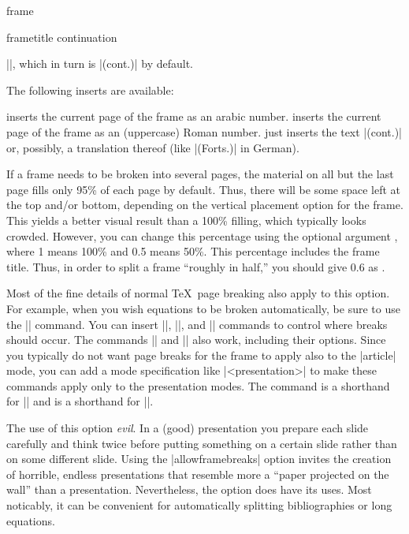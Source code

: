 \begin{environment}{{frame}%
    }
\begin{frame}[<+->][plain]
\begin{frame}[plain]
\begin{itemize}
\begin{enumerate}
\begin{template*}{frametitle continuation}
\begin{templateoptions}
          |\insertcontinuationtext|,  which  in turn is |(cont.)| by
          default. 
        \end{templateoptions}
        The following inserts are available:
        \begin{templateinserts}
          \iteminsert{\insertcontinuationcount}
          inserts the current page of the frame as an arabic number.
          \iteminsert{\insertcontinuationcountroman}
          inserts the current page of the frame as an (uppercase)
          Roman number.
          \iteminsert{\insertcontinuationtext}
          just inserts the text |(cont.)| or, possibly, a translation
          thereof (like |(Forts.)| in German). 
        \end{templateinserts}
      \end{template*}
    \end{enumerate}
    If a frame needs to be broken into several pages, the material on
    all but the last page fills only 95\% of each page by
    default. Thus, there will be some space left at the top and/or
    bottom, depending on the vertical placement option for the
    frame. This yields a better visual result than a 100\% filling,
    which typically looks crowded. However, you can change this
    percentage using the optional argument , where 1
    means 100\% and 0.5 means 50\%. This percentage includes
    the frame title. Thus, in order to split a frame ``roughly in
    half,'' you should give 0.6 as .

    Most of the fine details of normal \TeX\ page breaking also apply
    to this option. For example, when you wish equations to be broken
    automatically, be sure to use the |\allowdisplaybreaks|
    command. You can insert |\break|, |\nobreak|, and |\penalty|
    commands to control where breaks should occur. The commands 
    |\pagebreak| and |\nopagebreak| also work, including their
    options. Since you typically do not want page breaks for the frame
    to apply also to the |article| mode, you can add a mode
    specification like |<presentation>| to make these commands apply
    only to the presentation modes. The command
    \declare{|\string\framebreak|} is a shorthand for
    || and \declare{|\string\noframebreak|} is
    a shorthand for ||.

    The use of this  option \emph{evil}. In a (good) presentation you
    prepare each slide carefully and think twice before putting something
    on a certain slide rather than on some different slide. Using the
    |allowframebreaks| option invites the creation of horrible, endless
    presentations that resemble more a ``paper projected on the wall''
    than a presentation. Nevertheless, the option does have its
    uses. Most noticably, it can be convenient for automatically
    splitting bibliographies or long equations.


\end{itemize}
\end{frame}
\end{frame}
\end{environment}
